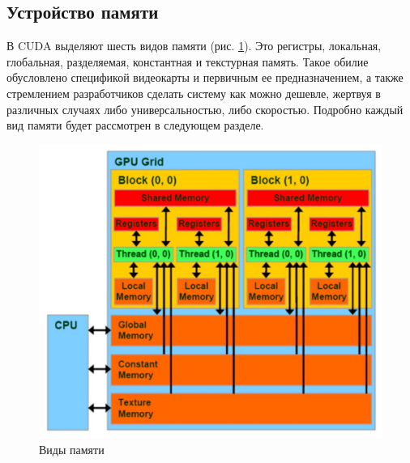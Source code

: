 \documentclass[a4paper, final]{article}
\begin{document}
    \subsection{Устройство памяти}
    В CUDA выделяют шесть видов памяти (рис. \ref{memory}). Это регистры, локальная, глобальная, разделяемая, константная и текстурная память.
    Такое обилие обусловлено спецификой видеокарты и первичным ее предназначением, а также стремлением разработчиков сделать систему как можно дешевле, жертвуя в различных случаях либо универсальностью, либо скоростью. Подробно каждый вид памяти будет рассмотрен в следующем разделе.
    \begin{figure}[h!]
    	\centering\includegraphics[scale=0.25]{memory.jpg}
         \caption{Виды памяти}	
     \label{memory}
    \end{figure}
\end{document}
